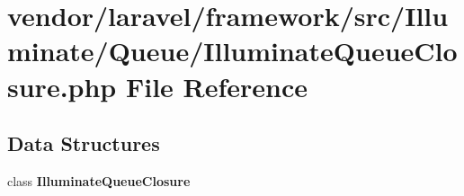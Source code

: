\section{vendor/laravel/framework/src/\+Illuminate/\+Queue/\+Illuminate\+Queue\+Closure.php File Reference}
\label{_illuminate_queue_closure_8php}
\subsection*{Data Structures}
\begin{DoxyCompactItemize}
\item 
class {\bf Illuminate\+Queue\+Closure}
\end{DoxyCompactItemize}
